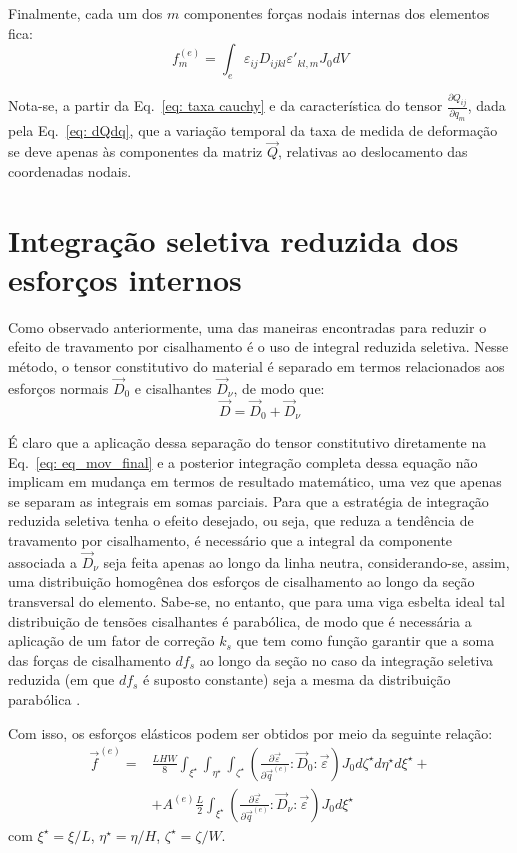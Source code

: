 Finalmente, cada um dos $m$ componentes forças nodais internas dos elementos fica:
\begin{equation}
    f_{m}^{(e)} = \int_{e} {\varepsilon_{ij} D_{ijkl} \varepsilon'_{kl,m} J_0 dV} \label{eq: f nodais 3}
\end{equation}

Nota-se, a partir da Eq.~\eqref{eq: taxa cauchy} e da característica do tensor $\frac{\partial Q_{ij}}{\partial q_m}$,
dada pela Eq.~\eqref{eq: dQdq}, que a variação temporal da taxa de medida de deformação se deve apenas às componentes 
da matriz $\vec{Q}$, relativas ao deslocamento
das coordenadas nodais. 

\section{Integração seletiva reduzida dos esforços internos}
Como observado anteriormente, uma das maneiras encontradas para reduzir o efeito de travamento por cisalhamento
é o uso de integral reduzida seletiva. Nesse método, o tensor constitutivo do material é separado em termos 
relacionados aos esforços normais $\vec{D}_0$ e cisalhantes $\vec{D}_\nu$, de modo que:
\begin{equation}
    \vec{D} = \vec{D}_0 + \vec{D}_\nu
\end{equation}

É claro que a aplicação dessa separação do tensor constitutivo diretamente na Eq.~\ref{eq: eq_mov_final} e a
posterior integração completa dessa equação não implicam em mudança em termos de resultado matemático, uma vez
que apenas se separam as integrais em somas parciais. Para que a estratégia de integração reduzida seletiva tenha o efeito desejado, 
ou seja, que reduza a tendência de travamento por cisalhamento, é necessário que a integral da componente associada
a $\vec{D}_\nu$ seja feita apenas ao longo da linha neutra, considerando-se, assim, uma distribuição homogênea dos
esforços de cisalhamento ao longo da seção transversal do elemento. Sabe-se, no entanto, que para uma viga esbelta ideal
tal distribuição de tensões cisalhantes é parabólica, de modo que é necessária a aplicação de um fator de correção
$k_s$ que tem como função garantir que a soma das forças de cisalhamento $df_s$ ao longo da seção no caso da integração seletiva
reduzida (em que $df_s$ é suposto constante) seja a mesma da distribuição parabólica \cite{gere_mecanica_2003}.

Com isso, os esforços elásticos podem ser obtidos por meio da seguinte relação:
\begin{align}
        \vec{f}^{(e)}   =& \frac{LHW}{8}\int_{\xi^\star}\int_{\eta^\star}\int_{\zeta^\star}{ \left(\frac{ \partial \vec{\varepsilon}}{\partial \vec{q}^{(e)}} : \vec{D}_0 : \vec{\varepsilon} \right) J_0 d\zeta^\star d\eta^\star d\xi^\star} + \nonumber\\
        & + A^{(e)}\frac{L}{2}\int_{\xi^\star}{ \left(\frac{ \partial \vec{\varepsilon}}{\partial \vec{q}^{(e)}} : \vec{D}_\nu : \vec{\varepsilon} \right)  J_0 d\xi^\star}\label{eq: full elastic force vector}
\end{align}
com $\xi^\star = \xi/L$, $\eta^\star = \eta/H$, $\zeta^\star = \zeta/W$.

